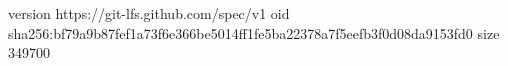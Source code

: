 version https://git-lfs.github.com/spec/v1
oid sha256:bf79a9b87fef1a73f6e366be5014ff1fe5ba22378a7f5eefb3f0d08da9153fd0
size 349700
